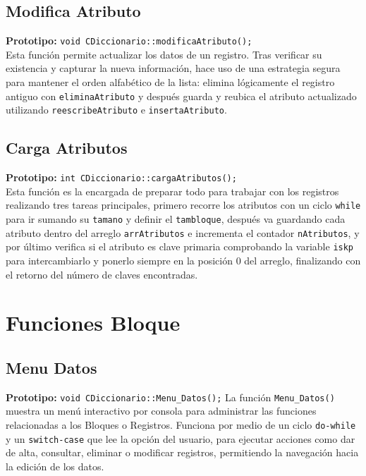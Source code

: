 \documentclass[12pt]{article}
\begin{document}
{}
\subsection*{Modifica Atributo}
\textbf{Prototipo:} \verb|void CDiccionario::modificaAtributo();|\\
Esta función permite actualizar los datos de un registro. 
Tras verificar su existencia y capturar la nueva información, 
hace uso de una estrategia segura para mantener el orden 
alfabético de la lista: elimina lógicamente el registro 
antiguo con \verb|eliminaAtributo| y después guarda y 
reubica el atributo actualizado utilizando 
\verb|reescribeAtributo| e \verb|insertaAtributo|.

{}
\subsection*{Carga Atributos}
\textbf{Prototipo:} \verb|int CDiccionario::cargaAtributos();|\\
Esta función es la encargada de preparar todo para trabajar con 
los registros realizando tres tareas principales, primero recorre 
los atributos con un ciclo \verb|while| para ir sumando su 
\verb|tamano| y definir el \verb|tambloque|, después va guardando 
cada atributo dentro del arreglo \verb|arrAtributos| e 
incrementa el contador \verb|nAtributos|, y por último verifica 
si el atributo es clave primaria comprobando la variable 
\verb|iskp| para intercambiarlo y ponerlo siempre en la posición 
0 del arreglo, finalizando con el retorno del número de claves 
encontradas.

\newpage
\section[Funciones Bloque]{Funciones \hfill \fontsize{14}{17}\selectfont Bloque}

{}
\subsection*{Menu Datos}
\textbf{Prototipo:} \verb|void CDiccionario::Menu_Datos();|
La función \verb|Menu_Datos()| muestra un menú interactivo por 
consola para administrar las funciones relacionadas a los 
Bloques o Registros. Funciona por medio de un ciclo 
\texttt{do-while} y un \texttt{switch-case} que lee la opción 
del usuario, para ejecutar acciones como dar de alta, consultar, 
eliminar o modificar registros, permitiendo la 
navegación hacia la edición de los datos.
\end{document}
